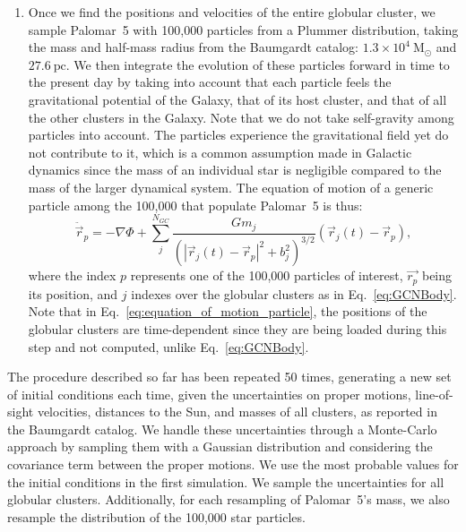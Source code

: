 \documentclass{aa}
\begin{document}
\begin{enumerate}
        \item Once we find the positions and velocities of the entire globular cluster, we sample Palomar~5 with 100,000 particles from a Plummer distribution, taking the mass and half-mass radius from the Baumgardt catalog: $1.3\times10^{4}~\textrm{M}_\odot$ and $27.6~\textrm{pc}$. We then integrate the evolution of these particles forward in time to the present day by taking into account that each particle feels the gravitational potential of the Galaxy, that of its host cluster, and that of all the other clusters in the Galaxy. Note that we do not take self-gravity among particles into account. The particles experience the gravitational field yet do not contribute to it, which is a common assumption made in Galactic dynamics since the mass of an individual star is negligible compared to the mass of the larger dynamical system. The equation of motion of a generic particle among the 100,000 that populate Palomar~5 is thus: 
        \begin{equation}
          \ddot{\vec{r}}_p = -\nabla \Phi + \left.\sum_{j}^{N_{GC}} \frac{Gm_j}{\left(|\vec{r}_j(t) - \vec{r}_p|^2 + b_j^2\right)^{3/2}}\right. \left(\vec{r}_j(t)- \vec{r}_p\right),
          \end{equation} \label{eq:equation_of_motion_particle} where the index $p$ represents one of the 100,000 particles of interest, $\vec{r_p}$ being its position, and $j$ indexes over the globular clusters as in Eq.~\ref{eq:GCNBody}. Note that in Eq.~\ref{eq:equation_of_motion_particle}, the positions of the globular clusters are time-dependent since they are being loaded during this step and not computed, unlike Eq.~\ref{eq:GCNBody}. 

      \end{enumerate}




        The procedure described so far has been repeated 50 times, generating a new set of initial conditions each time, given the uncertainties on proper motions, line-of-sight velocities, distances to the Sun, and masses of all clusters, as reported in the Baumgardt catalog. We handle these uncertainties through a Monte-Carlo approach by sampling them with a Gaussian distribution and considering the covariance term between the proper motions. We use the most probable values for the initial conditions in the first simulation. We sample the uncertainties for all globular clusters. Additionally, for each resampling of Palomar~5's mass, we also resample the distribution of the 100,000 star particles. 
\end{document}
